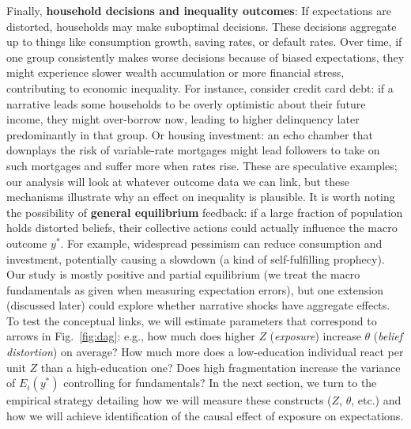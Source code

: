 \documentclass[12pt]{article}
\begin{document}
Finally, \textbf{household decisions and inequality outcomes}: If expectations are distorted, households may make suboptimal decisions. These decisions aggregate up to things like consumption growth, saving rates, or default rates. Over time, if one group consistently makes worse decisions because of biased expectations, they might experience slower wealth accumulation or more financial stress, contributing to economic inequality. For instance, consider credit card debt: if a narrative leads some households to be overly optimistic about their future income, they might over-borrow now, leading to higher delinquency later predominantly in that group. Or housing investment: an echo chamber that downplays the risk of variable-rate mortgages might lead followers to take on such mortgages and suffer more when rates rise. These are speculative examples; our analysis will look at whatever outcome data we can link, but these mechanisms illustrate why an effect on inequality is plausible.
It is worth noting the possibility of \textbf{general equilibrium} feedback: if a large fraction of population holds distorted beliefs, their collective actions could actually influence the macro outcome $y^*$. For example, widespread pessimism can reduce consumption and investment, potentially causing a slowdown (a kind of self-fulfilling prophecy). Our study is mostly positive and partial equilibrium (we treat the macro fundamentals as given when measuring expectation errors), but one extension (discussed later) could explore whether narrative shocks have aggregate effects.
To test the conceptual links, we will estimate parameters that correspond to arrows in Fig.~\ref{fig:dag}: e.g., how much does higher $Z$ (\emph{exposure}) increase $\theta$ (\emph{belief distortion}) on average? How much more does a low-education individual react per unit $Z$ than a high-education one? Does high fragmentation increase the variance of $E_i(y^*)$ controlling for fundamentals?
In the next section, we turn to the empirical strategy detailing how we will measure these constructs ($Z$, $\theta$, etc.) and how we will achieve identification of the causal effect of exposure on expectations.
\end{document}
